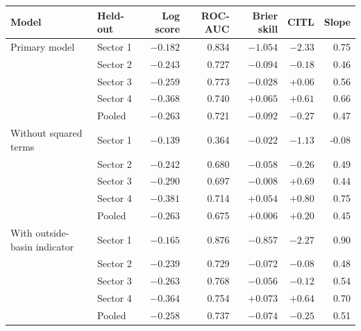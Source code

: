 \begin{tabular}{llrrrrr}
\toprule
Model & Held-out & Log score & ROC-AUC & Brier skill & CITL & Slope \\
\midrule
Primary model & Sector 1 & $-0.182$ & 0.834 & $-1.054$ & $-2.33$ & 0.75 \\
 & Sector 2 & $-0.243$ & 0.727 & $-0.094$ & $-0.18$ & 0.46 \\
 & Sector 3 & $-0.259$ & 0.773 & $-0.028$ & $+0.06$ & 0.56 \\
 & Sector 4 & $-0.368$ & 0.740 & $+0.065$ & $+0.61$ & 0.66 \\
 & Pooled & $-0.263$ & 0.721 & $-0.092$ & $-0.27$ & 0.47 \\
\addlinespace
Without squared terms & Sector 1 & $-0.139$ & 0.364 & $-0.022$ & $-1.13$ & -0.08 \\
 & Sector 2 & $-0.242$ & 0.680 & $-0.058$ & $-0.26$ & 0.49 \\
 & Sector 3 & $-0.290$ & 0.697 & $-0.008$ & $+0.69$ & 0.44 \\
 & Sector 4 & $-0.381$ & 0.714 & $+0.054$ & $+0.80$ & 0.75 \\
 & Pooled & $-0.263$ & 0.675 & $+0.006$ & $+0.20$ & 0.45 \\
\addlinespace
With outside-basin indicator & Sector 1 & $-0.165$ & 0.876 & $-0.857$ & $-2.27$ & 0.90 \\
 & Sector 2 & $-0.239$ & 0.729 & $-0.072$ & $-0.08$ & 0.48 \\
 & Sector 3 & $-0.263$ & 0.768 & $-0.056$ & $-0.12$ & 0.54 \\
 & Sector 4 & $-0.364$ & 0.754 & $+0.073$ & $+0.64$ & 0.70 \\
 & Pooled & $-0.258$ & 0.737 & $-0.074$ & $-0.25$ & 0.51 \\
\bottomrule
\end{tabular}
